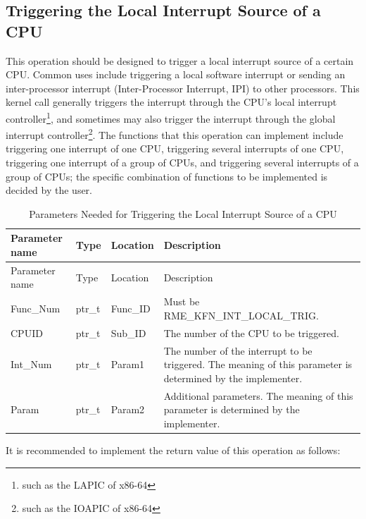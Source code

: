 \subsection{Triggering the Local Interrupt Source of a CPU}\label{subsec:8-trigger-local-interrupt-source}

This operation should be designed to trigger a local interrupt source of a certain CPU. Common uses include triggering a local software interrupt or sending an inter-processor interrupt (Inter-Processor
Interrupt, IPI) to other processors. This kernel call generally triggers the interrupt through the CPU's local interrupt controller\footnote{such as the LAPIC of x86-64}, and sometimes may also trigger the interrupt through the global interrupt controller\footnote{such as the IOAPIC of x86-64}. The functions that this operation can implement include triggering one interrupt of one CPU, triggering several interrupts of one CPU, triggering one interrupt of a group of CPUs, and triggering several interrupts of a group of CPUs; the specific combination of functions to be implemented is decided by the user.

\begin{xltabular}{\textwidth}{@{}>{\hsize\raggedright\arraybackslash}X>{\hsize\raggedright\arraybackslash}X>{\hsize\raggedright\arraybackslash}X>{\hsize\raggedright\arraybackslash}X@{}}
\caption{Parameters Needed for Triggering the Local Interrupt Source of a CPU}\label{tab:8-20-trigger-local-interrupt-source-parameters}\\
\toprule
Parameter name & Type & Location & Description\tabularnewline
\endfirsthead
\toprule
Parameter name & Type & Location & Description\tabularnewline
\midrule
\endhead
\bottomrule
\endlastfoot
Func\_Num & ptr\_t & Func\_ID & Must be RME\_KFN\_INT\_LOCAL\_TRIG.\tabularnewline
CPUID & ptr\_t & Sub\_ID & The number of the CPU to be triggered.\tabularnewline
Int\_Num & ptr\_t & Param1 &
The number of the interrupt to be triggered. The meaning of this parameter is determined by the implementer.\tabularnewline
Param & ptr\_t & Param2 &
Additional parameters. The meaning of this parameter is determined by the implementer.\tabularnewline
\end{xltabular}
\nopagebreak[4]

It is recommended to implement the return value of this operation as follows:

